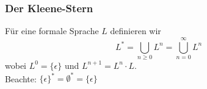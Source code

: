 \documentclass{beamer}
\begin{document}
\begin{frame} \frametitle{Der Kleene-Stern}
	\begin{Definition}
		Für eine formale Sprache $L$ definieren wir
		\begin{equation*}
		L^\ast = \bigcup_{n \ge 0} L^n = \bigcup_{n = 0}^\infty L^n
		\end{equation*}
		wobei $L^0 = \{ \epsilon \}$ und $L^{n+1} = L^n \cdot L$. \\
		Beachte: $\{ \epsilon \}^\ast = \emptyset^\ast = \{ \epsilon \}$
	\end{Definition}
\end{frame}
\end{document}
